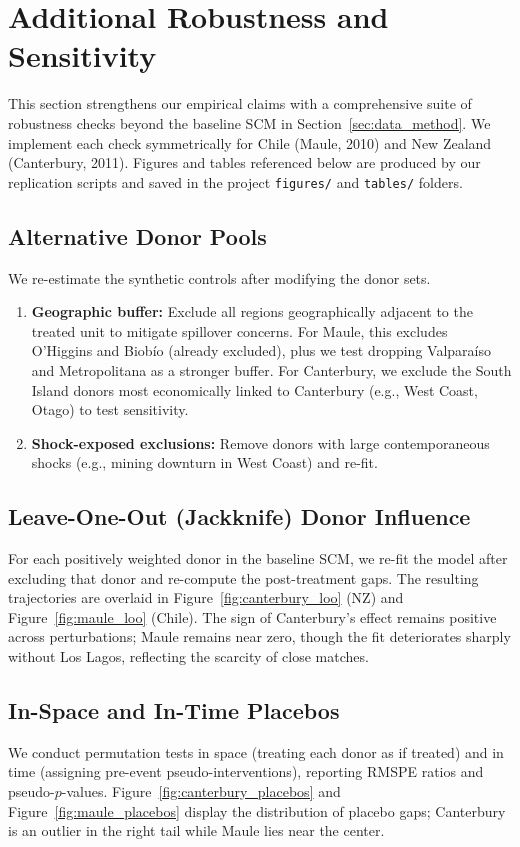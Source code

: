 \section{Additional Robustness and Sensitivity}\label{sec:robustness}
This section strengthens our empirical claims with a comprehensive suite of robustness checks beyond the baseline SCM in Section~\ref{sec:data_method}. We implement each check symmetrically for Chile (Maule, 2010) and New Zealand (Canterbury, 2011). Figures and tables referenced below are produced by our replication scripts and saved in the project \texttt{figures/} and \texttt{tables/} folders.

\subsection{Alternative Donor Pools}
We re-estimate the synthetic controls after modifying the donor sets.
\begin{enumerate}[label=(\alph*)]
\item \textbf{Geographic buffer:} Exclude all regions geographically adjacent to the treated unit to mitigate spillover concerns. For Maule, this excludes O'Higgins and Biobío (already excluded), plus we test dropping Valparaíso and Metropolitana as a stronger buffer. For Canterbury, we exclude the South Island donors most economically linked to Canterbury (e.g., West Coast, Otago) to test sensitivity.
\item \textbf{Shock-exposed exclusions:} Remove donors with large contemporaneous shocks (e.g., mining downturn in West Coast) and re-fit. %
\end{enumerate}

\subsection{Leave-One-Out (Jackknife) Donor Influence}
For each positively weighted donor in the baseline SCM, we re-fit the model after excluding that donor and re-compute the post-treatment gaps. The resulting trajectories are overlaid in Figure~\ref{fig:canterbury_loo} (NZ) and Figure~\ref{fig:maule_loo} (Chile). The sign of Canterbury's effect remains positive across perturbations; Maule remains near zero, though the fit deteriorates sharply without Los Lagos, reflecting the scarcity of close matches.

\subsection{In-Space and In-Time Placebos}
We conduct permutation tests in space (treating each donor as if treated) and in time (assigning pre-event pseudo-interventions), reporting RMSPE ratios and pseudo-$p$-values. Figure~\ref{fig:canterbury_placebos} and Figure~\ref{fig:maule_placebos} display the distribution of placebo gaps; Canterbury is an outlier in the right tail while Maule lies near the center.

